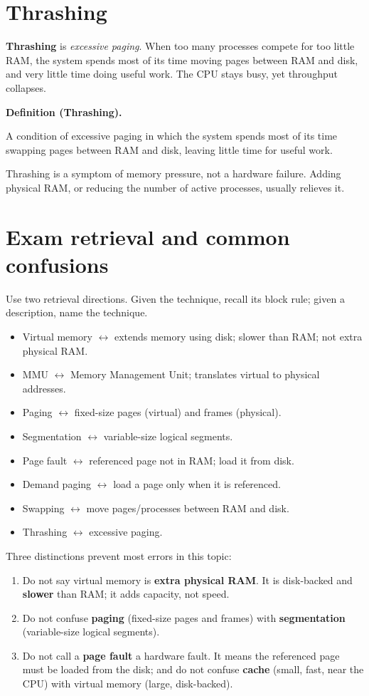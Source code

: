\documentclass[11pt]{article}
\newenvironment{definitionbox}[1]{%
  \par\noindent\textbf{Definition (#1).}\ \itshape
}{\par\vspace{0.3em}}
\begin{document}
\section{Thrashing}
\textbf{Thrashing} is \emph{excessive paging}. When too many processes compete
for too little RAM, the system spends most of its time moving pages between RAM
and disk, and very little time doing useful work. The CPU stays busy, yet
throughput collapses.

\begin{definitionbox}{Thrashing}
A condition of excessive paging in which the system spends most of its time
swapping pages between RAM and disk, leaving little time for useful work.
\end{definitionbox}

Thrashing is a symptom of memory pressure, not a hardware failure. Adding
physical RAM, or reducing the number of active processes, usually relieves it.

\section{Exam retrieval and common confusions}
Use two retrieval directions. Given the technique, recall its block rule; given
a description, name the technique.
\begin{itemize}
  \item Virtual memory $\leftrightarrow$ extends memory using disk; slower than
    RAM; not extra physical RAM.
  \item MMU $\leftrightarrow$ Memory Management Unit; translates virtual to
    physical addresses.
  \item Paging $\leftrightarrow$ fixed-size pages (virtual) and frames
    (physical).
  \item Segmentation $\leftrightarrow$ variable-size logical segments.
  \item Page fault $\leftrightarrow$ referenced page not in RAM; load it from
    disk.
  \item Demand paging $\leftrightarrow$ load a page only when it is referenced.
  \item Swapping $\leftrightarrow$ move pages/processes between RAM and disk.
  \item Thrashing $\leftrightarrow$ excessive paging.
\end{itemize}

Three distinctions prevent most errors in this topic:
\begin{enumerate}
  \item Do not say virtual memory is \textbf{extra physical RAM}. It is
    disk-backed and \textbf{slower} than RAM; it adds capacity, not speed.
  \item Do not confuse \textbf{paging} (fixed-size pages and frames) with
    \textbf{segmentation} (variable-size logical segments).
  \item Do not call a \textbf{page fault} a hardware fault. It means the
    referenced page must be loaded from the disk; and do not confuse
    \textbf{cache} (small, fast, near the CPU) with virtual memory (large,
    disk-backed).
\end{enumerate}
\end{document}
